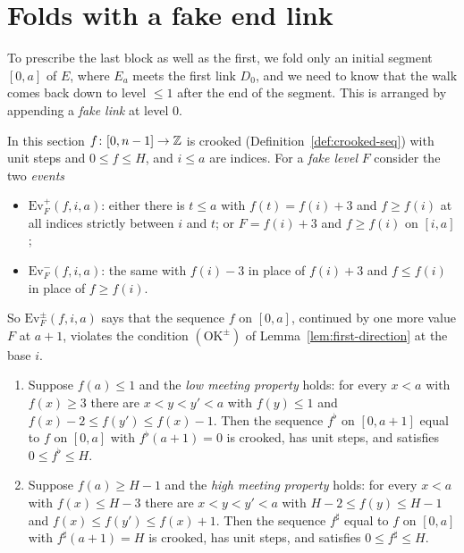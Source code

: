 
\section{Folds with a fake end link}\label{sec:fold-fake}

To prescribe the last block as well as the first, we fold only an initial segment $[0,a]$ of $E$, where $E_a$ meets the first
link $D_0$, and we need to know that the walk comes back down to level $\le1$ after the end of the segment. This is arranged by
appending a \emph{fake link} at level $0$.

In this section $f\colon[0,n-1]\to\mathbb{Z}$ is crooked (Definition~\ref{def:crooked-seq}) with unit steps and $0\le f\le H$, and $i\le a$
are indices. For a \emph{fake level} $F$ consider the two \emph{events}
\begin{itemize}
\item $\mathrm{Ev}^+_F(f,i,a)$: either there is $t\le a$ with $f(t)=f(i)+3$ and $f\ge f(i)$ at all indices strictly between $i$ and
$t$; or $F=f(i)+3$ and $f\ge f(i)$ on $[i,a]$;
\item $\mathrm{Ev}^-_F(f,i,a)$: the same with $f(i)-3$ in place of $f(i)+3$ and $f\le f(i)$ in place of $f\ge f(i)$.
\end{itemize}
So $\mathrm{Ev}^{\pm}_F(f,i,a)$ says that the sequence $f$ on $[0,a]$, continued by one more value $F$ at $a+1$, violates the condition
$(\mathrm{OK}^\pm)$ of Lemma~\ref{lem:first-direction} at the base $i$.


\begin{lemma}\label{lem:crooked-ext}
\begin{enumerate}[label=(\alph*)]
\item Suppose $f(a)\le1$ and the \emph{low meeting property} holds: for every $x<a$ with $f(x)\ge3$ there are $x<y<y'<a$ with
$f(y)\le1$ and $f(x)-2\le f(y')\le f(x)-1$. Then the sequence $f^\flat$ on $[0,a+1]$ equal to $f$ on $[0,a]$ with $f^\flat(a+1)=0$ is
crooked, has unit steps, and satisfies $0\le f^\flat\le H$.
\item Suppose $f(a)\ge H-1$ and the \emph{high meeting property} holds: for every $x<a$ with $f(x)\le H-3$ there are $x<y<y'<a$ with
$H-2\le f(y)\le H-1$ and $f(x)\le f(y')\le f(x)+1$. Then the sequence $f^\sharp$ equal to $f$ on $[0,a]$ with $f^\sharp(a+1)=H$ is
crooked, has unit steps, and satisfies $0\le f^\sharp\le H$.
\end{enumerate}
\end{lemma}

